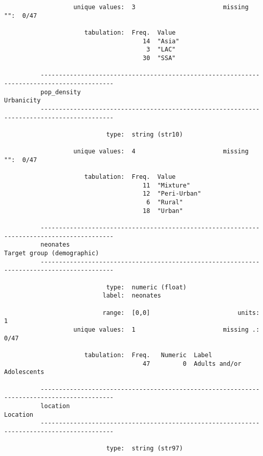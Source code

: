 \documentclass{article}
\begin{document}
\begin{verbatim}
                   unique values:  3                        missing "":  0/47
          
                      tabulation:  Freq.  Value
                                      14  "Asia"
                                       3  "LAC"
                                      30  "SSA"
          
          ------------------------------------------------------------------------------------------
          pop_density                                                                     Urbanicity
          ------------------------------------------------------------------------------------------
          
                            type:  string (str10)
          
                   unique values:  4                        missing "":  0/47
          
                      tabulation:  Freq.  Value
                                      11  "Mixture"
                                      12  "Peri-Urban"
                                       6  "Rural"
                                      18  "Urban"
          
          ------------------------------------------------------------------------------------------
          neonates                                                        Target group (demographic)
          ------------------------------------------------------------------------------------------
          
                            type:  numeric (float)
                           label:  neonates
          
                           range:  [0,0]                        units:  1
                   unique values:  1                        missing .:  0/47
          
                      tabulation:  Freq.   Numeric  Label
                                      47         0  Adults and/or Adolescents
          
          ------------------------------------------------------------------------------------------
          location                                                                          Location
          ------------------------------------------------------------------------------------------
          
                            type:  string (str97)
          

\end{verbatim}
\end{document}
